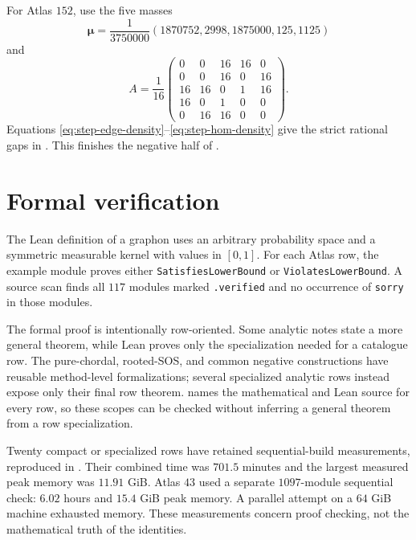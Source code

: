 \documentclass[11pt]{article}
\numberwithin{equation}{section}
\theoremstyle{definition}
\theoremstyle{remark}
\begin{document}
For Atlas $152$, use the five masses
\begin{equation}
 \boldsymbol\mu=\frac1{3750000}
 (1870752,2998,1875000,125,1125)
 \label{eq:atlas152-masses}
\end{equation}
and
\begin{equation}
 A=\frac1{16}
 \begin{pmatrix}
 0&0&16&16&0\\
 0&0&16&0&16\\
 16&16&0&1&16\\
 16&0&1&0&0\\
 0&16&16&0&0
 \end{pmatrix}.
 \label{eq:atlas152-matrix}
\end{equation}
Equations \eqref{eq:step-edge-density}--\eqref{eq:step-hom-density} give the
strict rational gaps in .  This finishes the
negative half of .

\section{Formal verification}

The Lean definition of a graphon uses an arbitrary probability space and a
symmetric measurable kernel with values in $[0,1]$.  For each Atlas row, the
example module proves either \texttt{SatisfiesLowerBound} or
\texttt{ViolatesLowerBound}.  A source scan finds all $117$ modules marked
\texttt{.verified} and no occurrence of \texttt{sorry} in those modules.

The formal proof is intentionally row-oriented.  Some analytic notes state a
more general theorem, while Lean proves only the specialization needed for a
catalogue row.  The pure-chordal, rooted-SOS, and common negative constructions
have reusable method-level formalizations; several specialized analytic rows
instead expose only their final row theorem.   names the
mathematical and Lean source for every row, so these scopes can be checked
without inferring a general theorem from a row specialization.

Twenty compact or specialized rows have retained sequential-build
measurements, reproduced in .  Their combined
time was $701.5$ minutes and the largest measured peak memory was
$11.91$ GiB.  Atlas $43$ used a separate $1097$-module sequential check:
$6.02$ hours and $15.4$ GiB peak memory.  A parallel attempt on a $64$ GiB
machine exhausted memory.  These measurements concern proof checking, not
the mathematical truth of the identities.
\end{document}
